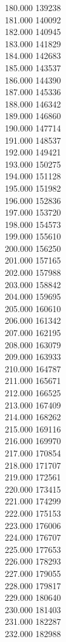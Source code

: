 { 180.000	139238 \\
 181.000	140092 \\
 182.000	140945 \\
 183.000	141829 \\
 184.000	142683 \\
 185.000	143537 \\
 186.000	144390 \\
 187.000	145336 \\
 188.000	146342 \\
 189.000	146860 \\
 190.000	147714 \\
 191.000	148537 \\
 192.000	149421 \\
 193.000	150275 \\
 194.000	151128 \\
 195.000	151982 \\
 196.000	152836 \\
 197.000	153720 \\
 198.000	154573 \\
 199.000	155610 \\
 200.000	156250 \\
 201.000	157165 \\
 202.000	157988 \\
 203.000	158842 \\
 204.000	159695 \\
 205.000	160610 \\
 206.000	161342 \\
 207.000	162195 \\
 208.000	163079 \\
 209.000	163933 \\
 210.000	164787 \\
 211.000	165671 \\
 212.000	166525 \\
 213.000	167409 \\
 214.000	168262 \\
 215.000	169116 \\
 216.000	169970 \\
 217.000	170854 \\
 218.000	171707 \\
 219.000	172561 \\
 220.000	173415 \\
 221.000	174299 \\
 222.000	175153 \\
 223.000	176006 \\
 224.000	176707 \\
 225.000	177653 \\
 226.000	178293 \\
 227.000	179055 \\
 228.000	179817 \\
 229.000	180640 \\
 230.000	181403 \\
 231.000	182287 \\
 232.000	182988 \\
}
